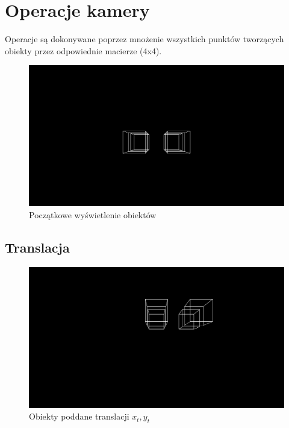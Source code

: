\documentclass{article}
\begin{document}
\section{Operacje kamery}

    Operacje są dokonywane poprzez mnożenie wszystkich punktów tworzących obiekty
    przez odpowiednie macierze (4x4).

    \begin{figure}[h]
        \includegraphics[width=\textwidth]{original}
        \caption{Początkowe wyświetlenie obiektów}
        \centering
    \end{figure}

\newpage

    \subsection{Translacja}

        \begin{figure}[h]
            \includegraphics[width=\textwidth]{translation}
            \caption{Obiekty poddane translacji \(x_t, y_t\)}
            \centering
        \end{figure}
    
\end{document}
